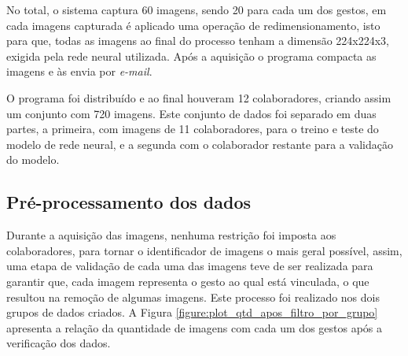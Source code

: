 \par No total, o sistema captura 60 imagens, sendo 20 para cada um dos gestos, em cada imagens capturada é aplicado uma operação de redimensionamento, isto para que, todas as imagens ao final do processo tenham a dimensão 224x224x3, exigida pela rede neural utilizada. Após a aquisição o programa compacta as imagens e às envia por \textit{e-mail}.





\par O programa foi distribuído e ao final houveram 12 colaboradores, criando assim um conjunto com 720 imagens. Este conjunto de dados foi separado em duas partes, a primeira, com imagens de 11 colaboradores, para o treino e teste do modelo de rede neural, e a segunda com o colaborador restante para a validação do modelo.

\subsection{Pré-processamento dos dados}

\par Durante a aquisição das imagens, nenhuma restrição foi imposta aos colaboradores, para tornar o identificador de imagens o mais geral possível, assim, uma etapa de validação de cada uma das imagens teve de ser realizada para garantir que, cada imagem representa o gesto ao qual está vinculada, o que resultou na remoção de algumas imagens. Este processo foi realizado nos dois grupos de dados criados. A Figura \ref{figure:plot_qtd_apos_filtro_por_grupo} apresenta a relação da quantidade de imagens com cada um dos gestos após a verificação dos dados. 

